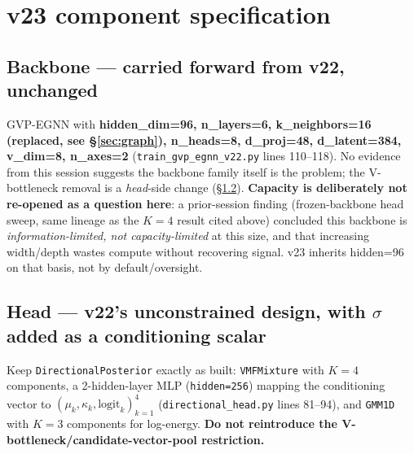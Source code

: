 \documentclass[11pt]{article}
\newcommand{\code}[1]{\texttt{#1}}
\begin{document}
\section{v23 component specification}

\subsection{Backbone --- carried forward from v22, unchanged}
GVP-EGNN with \textbf{hidden\_dim=96, n\_layers=6, k\_neighbors=16 (replaced, see
\S\ref{sec:graph}), n\_heads=8, d\_proj=48, d\_latent=384, v\_dim=8, n\_axes=2}
(\code{train\_gvp\_egnn\_v22.py} lines 110--118). No evidence from this session suggests the
backbone family itself is the problem; the V-bottleneck removal is a \emph{head}-side change
(\S\ref{sec:head}). \textbf{Capacity is deliberately not re-opened as a question here}: a
prior-session finding (frozen-backbone head sweep, same lineage as the $K{=}4$ result cited
above) concluded this backbone is \emph{information-limited, not capacity-limited} at this
size, and that increasing width/depth wastes compute without recovering signal. v23 inherits
hidden=96 on that basis, not by default/oversight.

\subsection{Head --- v22's unconstrained design, with $\sigma$ added as a conditioning scalar}
\label{sec:head}
Keep \code{DirectionalPosterior} exactly as built: \code{VMFMixture} with
\textbf{$K{=}4$} components, a 2-hidden-layer MLP (\code{hidden=256}) mapping the
conditioning vector to $(\mu_k,\kappa_k,\text{logit}_k)_{k=1}^4$
(\code{directional\_head.py} lines 81--94), and \code{GMM1D} with $K{=}3$ components for
log-energy. \textbf{Do not reintroduce the V-bottleneck/candidate-vector-pool restriction.}
\end{document}
